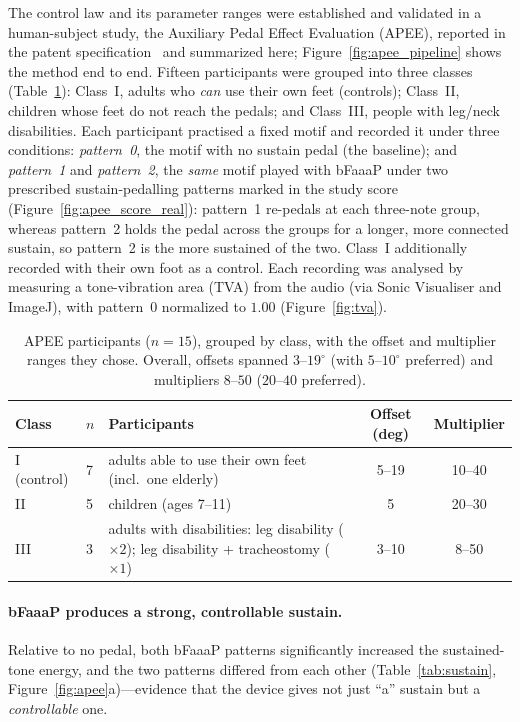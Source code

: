 The control law and its parameter ranges were established and validated in a
human-subject study, the Auxiliary Pedal Effect Evaluation (APEE), reported in the
patent specification~\cite{jp6726319} and summarized here;
Figure~\ref{fig:apee_pipeline} shows the method end to end. Fifteen participants
were grouped into three classes (Table~\ref{tab:participants}): Class~I, adults who
\emph{can} use their own feet (controls); Class~II, children whose feet do not
reach the pedals; and Class~III, people with leg/neck disabilities. Each
participant practised a fixed motif and recorded it under three conditions:
\emph{pattern~0}, the motif with no sustain pedal (the baseline); and
\emph{pattern~1} and \emph{pattern~2}, the \emph{same} motif played with bFaaaP
under two prescribed sustain-pedalling patterns marked in the study score
(Figure~\ref{fig:apee_score_real}): pattern~1 re-pedals at each three-note group,
whereas pattern~2 holds the pedal across the groups for a longer, more connected
sustain, so pattern~2 is the more sustained of the two. Class~I additionally
recorded with their
own foot as a control. Each recording was analysed by measuring a tone-vibration
area (TVA) from the audio (via Sonic Visualiser and ImageJ), with pattern~0
normalized to $1.00$ (Figure~\ref{fig:tva}).

\begin{table}[tbp]
\caption{APEE participants ($n=15$), grouped by class, with the offset and
multiplier ranges they chose. Overall, offsets spanned $3$--$19^\circ$ (with
$5$--$10^\circ$ preferred) and multipliers $8$--$50$ ($20$--$40$ preferred).}
\label{tab:participants}
\small
\begin{tabular}{@{}llp{4.6cm}cc@{}}
\toprule
Class & $n$ & Participants & Offset (deg) & Multiplier \\
\midrule
I (control) & 7 & adults able to use their own feet (incl.\ one elderly) & 5--19 & 10--40 \\
II & 5 & children (ages 7--11) & 5 & 20--30 \\
III & 3 & adults with disabilities: leg disability ($\times2$); leg disability + tracheostomy ($\times1$) & 3--10 & 8--50 \\
\bottomrule
\end{tabular}
\end{table}

\paragraph{bFaaaP produces a strong, controllable sustain.}
Relative to no pedal, both bFaaaP patterns significantly increased the
sustained-tone energy, and the two patterns differed from each other
(Table~\ref{tab:sustain}, Figure~\ref{fig:apee}a)---evidence that the device gives
not just ``a'' sustain but a \emph{controllable} one.


